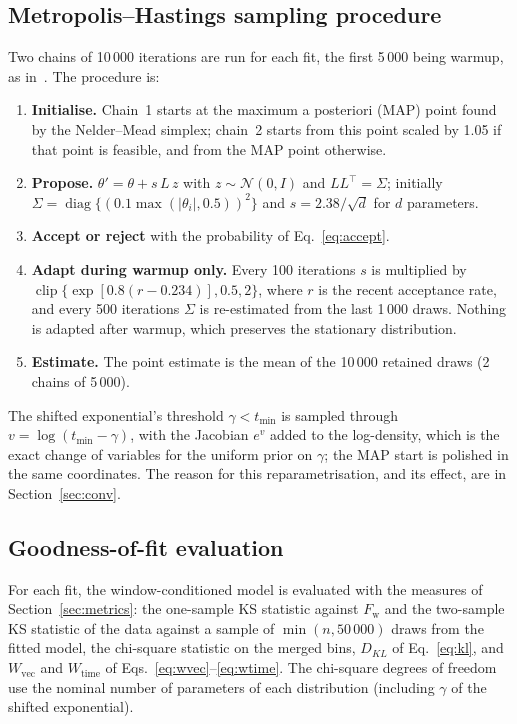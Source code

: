 \documentclass[11pt,a4paper]{article}
\numberwithin{equation}{section}
\newcommand{\Wvec}{W_{\mathrm{vec}}}
\newcommand{\Wtime}{W_{\mathrm{time}}}
\begin{document}
\subsection{Metropolis--Hastings sampling procedure}
Two chains of 10\,000 iterations are run for each fit, the first 5\,000 being warmup, as in~\cite{leungbootnak}. The procedure is:
\begin{enumerate}
  \item \textbf{Initialise.} Chain~1 starts at the maximum a posteriori (MAP) point found by the Nelder--Mead simplex; chain~2 starts from this point
        scaled by 1.05 if that point is feasible, and from the MAP point otherwise.
  \item \textbf{Propose.} $\theta'=\theta+s\,L\,z$ with $z\sim\mathcal N(0,I)$ and $LL^{\top}=\Sigma$; initially
        $\Sigma=\operatorname{diag}\{(0.1\max(|\theta_i|,0.5))^2\}$ and $s=2.38/\sqrt d$ for $d$ parameters.
  \item \textbf{Accept or reject} with the probability of Eq.~\eqref{eq:accept}.
  \item \textbf{Adapt during warmup only.} Every 100 iterations $s$ is multiplied by $\operatorname{clip}\{\exp[0.8(r-0.234)],0.5,2\}$, where $r$ is the recent acceptance
        rate, and every 500 iterations $\Sigma$ is re-estimated from the last 1\,000 draws. Nothing is adapted after warmup, which preserves the stationary distribution.
  \item \textbf{Estimate.} The point estimate is the mean of the 10\,000 retained draws (2 chains of 5\,000).
\end{enumerate}
The shifted exponential's threshold $\gamma<t_{\min}$ is sampled through $v=\log(t_{\min}-\gamma)$, with the Jacobian $e^{v}$ added to the log-density, which is the exact change
of variables for the uniform prior on $\gamma$; the MAP start is polished in the same coordinates. The reason for this reparametrisation, and its effect, are in Section~\ref{sec:conv}.

\subsection{Goodness-of-fit evaluation}\label{sec:gofmethod}
For each fit, the window-conditioned model is evaluated with the measures of Section~\ref{sec:metrics}: the one-sample KS statistic against $F_{\mathrm w}$ and the two-sample KS statistic of
the data against a sample of $\min(n,50\,000)$ draws from the fitted model, the chi-square statistic on the merged bins, $D_{KL}$ of Eq.~\eqref{eq:kl},
and $\Wvec$ and $\Wtime$ of Eqs.~\eqref{eq:wvec}--\eqref{eq:wtime}. The chi-square degrees of freedom use the nominal number of parameters of each distribution (including $\gamma$ of the shifted exponential).
\end{document}
